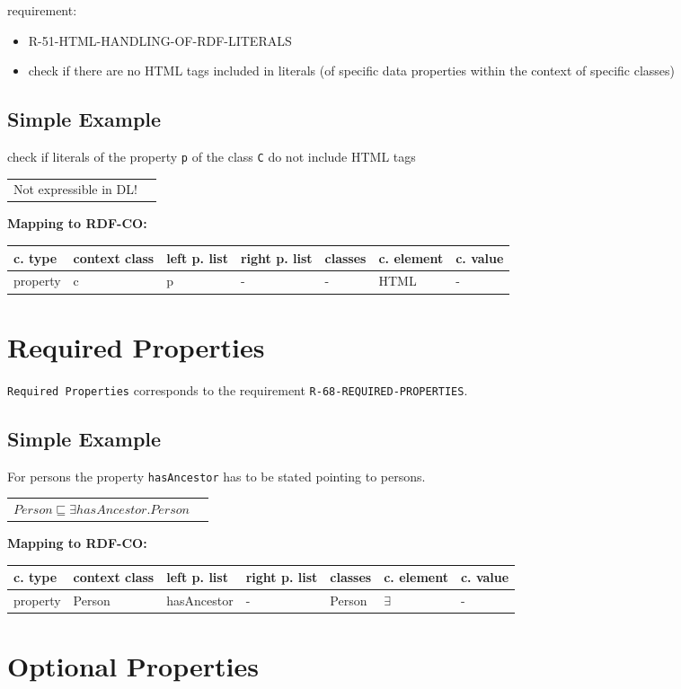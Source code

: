 \documentclass{llncs}
\newcommand{\ms}[1]{\texttt{#1}}
\newenvironment{gcotable}{
  \scriptsize
  \sffamily
  \vspace{0cm}
	\begin{center}
	\textbf{\vspace{0.4cm}Mapping to RDF-CO:} \\
  \begin{tabular}{l|l|l|l|l|l|l}
	\hline
  \textbf{c. type} & \textbf{context class} & \textbf{left p. list} & \textbf{right p. list} & \textbf{classes} & \textbf{c. element} & \textbf{c. value} \\
  \hline

}{
  \hline
  \end{tabular}
	\end{center}
}
\newenvironment{DL}{
  \vspace{0cm}
	\begin{center}
  \begin{tabular}{r l}

}{
  \end{tabular}
	\end{center}
}
\begin{document}
requirement:

\begin{itemize}
	\item R-51-HTML-HANDLING-OF-RDF-LITERALS
\end{itemize}

\begin{itemize}
	\item check if there are no HTML tags included in literals (of specific data properties within the context of specific classes)
\end{itemize}

\subsection{Simple Example}

check if literals of the property \ms{p} of the class \ms{C} do not include HTML tags

\begin{DL}
Not expressible in DL!
\end{DL}

\begin{gcotable}
property & c & p & - & - & HTML & - \\
\end{gcotable}

\section{Required Properties}

\ms{Required Properties} corresponds to the requirement \ms{R-68-REQUIRED-PROPERTIES}.

\subsection{Simple Example}

For persons the property \ms{hasAncestor} has to be stated pointing to persons.

\begin{DL}
$Person \sqsubseteq \exists hasAncestor.Person$
\end{DL}

\begin{gcotable}
property & Person & hasAncestor & - & Person & $\exists$ & - \\
\end{gcotable}

\section{Optional Properties}
\end{document}
